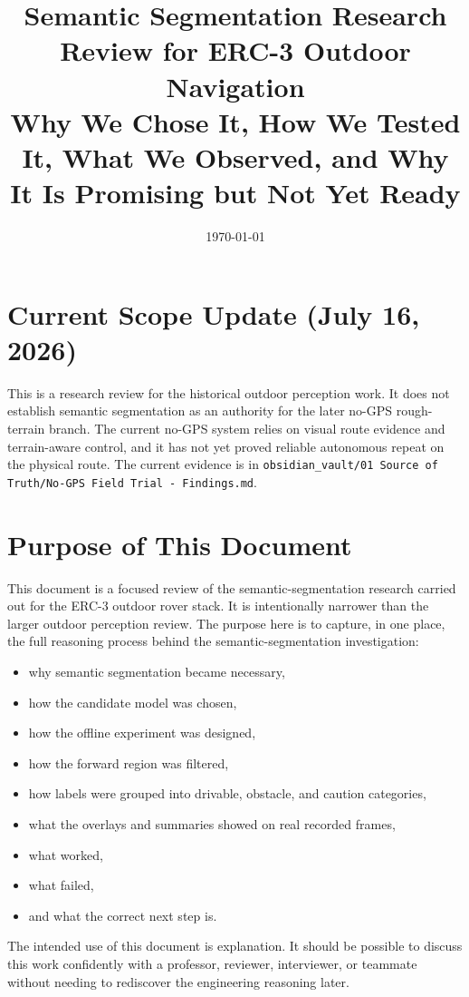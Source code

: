 \documentclass[11pt]{article}
\title{Semantic Segmentation Research Review for ERC-3 Outdoor Navigation\\
\large Why We Chose It, How We Tested It, What We Observed, and Why It Is Promising but Not Yet Ready}
\author{}
\date{\today}
\begin{document}
\maketitle

\section*{Current Scope Update (July 16, 2026)}
This is a research review for the historical outdoor perception work. It does
not establish semantic segmentation as an authority for the later no-GPS
rough-terrain branch. The current no-GPS system relies on visual route evidence
and terrain-aware control, and it has not yet proved reliable autonomous repeat
on the physical route. The current evidence is in
\texttt{obsidian\_vault/01 Source of Truth/No-GPS Field Trial - Findings.md}.

\section{Purpose of This Document}
This document is a focused review of the semantic-segmentation research carried out for the ERC-3 outdoor rover stack. It is intentionally narrower than the larger outdoor perception review. The purpose here is to capture, in one place, the full reasoning process behind the semantic-segmentation investigation:
\begin{itemize}[leftmargin=*]
\item why semantic segmentation became necessary,
\item how the candidate model was chosen,
\item how the offline experiment was designed,
\item how the forward region was filtered,
\item how labels were grouped into drivable, obstacle, and caution categories,
\item what the overlays and summaries showed on real recorded frames,
\item what worked,
\item what failed,
\item and what the correct next step is.
\end{itemize}

The intended use of this document is explanation. It should be possible to discuss this work confidently with a professor, reviewer, interviewer, or teammate without needing to rediscover the engineering reasoning later.
\end{document}
